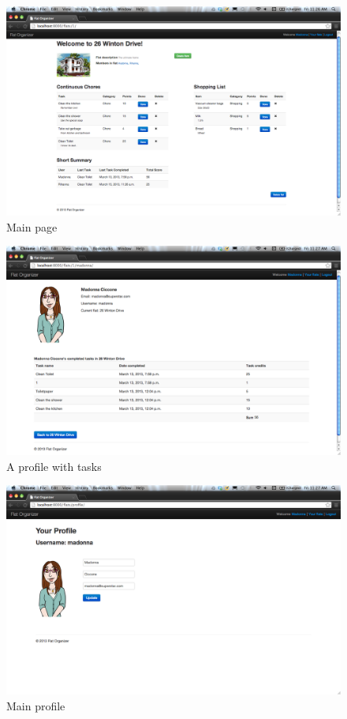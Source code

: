 \documentclass{sig-alt-release2}
\begin{document}
\begin{figure}[!ht]
\centering
\includegraphics[scale=0.2]{tasks}
\caption{Main page}
\label{fig:tasks_shot}
\end{figure}

\begin{figure}[!ht]
\centering
\includegraphics[scale=0.2]{profilewithtasks}
\caption{A profile with tasks}
\label{fig:profilewt_shot}
\end{figure}

\begin{figure}[!ht]
\centering
\includegraphics[scale=0.2]{profile}
\caption{Main profile}
\label{fig:profile_shot}
\end{figure}
\end{document}

